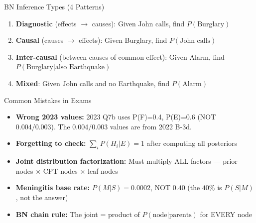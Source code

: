 \documentclass[12pt,a4paper]{article}
\begin{document}
\begin{keybox}{BN Inference Types (4 Patterns)}
\begin{enumerate}[noitemsep]
  \item \textbf{Diagnostic} (effects $\to$ causes): Given John calls, find $P(\text{Burglary})$
  \item \textbf{Causal} (causes $\to$ effects): Given Burglary, find $P(\text{John calls})$
  \item \textbf{Inter-causal} (between causes of common effect): Given Alarm, find $P(\text{Burglary}|\text{also Earthquake})$
  \item \textbf{Mixed}: Given John calls and no Earthquake, find $P(\text{Alarm})$
\end{enumerate}
\end{keybox}

\begin{warnbox}{Common Mistakes in Exams}
\begin{itemize}[noitemsep]
  \item \textbf{Wrong 2023 values:} 2023 Q7b uses P(F)=0.4, P(E)=0.6 (NOT 0.004/0.003). The 0.004/0.003 values are from 2022 B-3d.
  \item \textbf{Forgetting to check:} $\sum_i P(H_i|E) = 1$ after computing all posteriors
  \item \textbf{Joint distribution factorization:} Must multiply ALL factors --- prior nodes $\times$ CPT nodes $\times$ leaf nodes
  \item \textbf{Meningitis base rate:} $P(M|S) = 0.0002$, NOT $0.40$ (the $40\%$ is $P(S|M)$, not the answer)
  \item \textbf{BN chain rule:} The joint = product of $P(\text{node}|\text{parents})$ for EVERY node
\end{itemize}
\end{warnbox}
\end{document}

